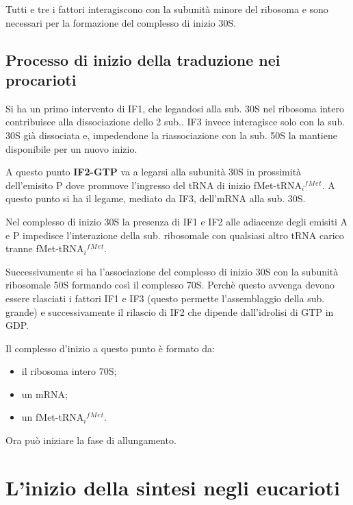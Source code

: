 \documentclass[11pt]{book}
\begin{document}
Tutti e tre i fattori interagiscono con la subunità minore del ribosoma
e sono necessari per la formazione del complesso di inizio 30S.

\subsection{Processo di inizio della traduzione nei
procarioti}\label{processo-di-inizio-della-traduzione-nei-procarioti}

Si ha un primo intervento di IF1, che legandosi alla sub. 30S nel
ribosoma intero contribuisce alla dissociazione dello 2 sub.. IF3 invece
interagisce solo con la sub. 30S già dissociata e, impedendone la
riassociazione con la sub. 50S la mantiene disponibile per un nuovo
inizio.

A questo punto \textbf{IF2-GTP} va a legarsi alla subunità 30S in
prossimità dell'emisito P dove promuove l'ingresso del tRNA di inizio
fMet-tRNA\(_i\)\(^f\)\(^M\)\(^e\)\(^t\). A questo punto si ha il legame,
mediato da IF3, dell'mRNA alla sub. 30S.

Nel complesso di inizio 30S la presenza di IF1 e IF2 alle adiacenze
degli emisiti A e P impedisce l'interazione della sub. ribosomale con
qualsiasi altro tRNA carico tranne
fMet-tRNA\(_i\)\(^f\)\(^M\)\(^e\)\(^t\).

Successivamente si ha l'associazione del complesso di inizio 30S con la
subunità ribosomale 50S formando così il complesso 70S. Perchè questo
avvenga devono essere rlasciati i fattori IF1 e IF3 (questo permette
l'assemblaggio della sub. grande) e successivamente il rilascio di IF2
che dipende dall'idrolisi di GTP in GDP.

Il complesso d'inizio a questo punto è formato da:

\begin{itemize}
\itemsep1pt\parskip0pt
\item
  il ribosoma intero 70S;
\item
  un mRNA;
\item
  un fMet-tRNA\(_i\)\(^f\)\(^M\)\(^e\)\(^t\).
\end{itemize}

Ora può iniziare la fase di allungamento.

\section{L'inizio della sintesi negli
eucarioti}\label{linizio-della-sintesi-negli-eucarioti}
\end{document}
